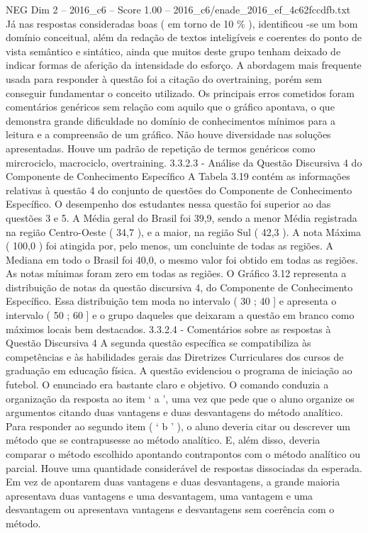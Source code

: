 \begin{textsample}{NEG Dim 2 – 2016\_c6 – Score 1.00 – 2016\_c6/enade\_2016\_ef\_4c62fccdfb.txt}
Já nas respostas consideradas boas ( em torno de 10 \% ), identificou -se um bom domínio conceitual, além da redação de textos inteligíveis e coerentes do ponto de vista semântico e sintático, ainda que muitos deste grupo tenham deixado de indicar formas de aferição da intensidade do esforço.
A abordagem mais frequente usada para responder à questão foi a citação do overtraining, porém sem conseguir fundamentar o conceito utilizado.
Os principais erros cometidos foram comentários genéricos sem relação com aquilo que o gráfico apontava, o que demonstra grande dificuldade no domínio de conhecimentos mínimos para a leitura e a compreensão de um gráfico.
Não houve diversidade nas soluções apresentadas.
Houve um padrão de repetição de termos genéricos como mircrociclo, macrociclo, overtraining. 3.3.2.3 - Análise da Questão Discursiva 4 do Componente de Conhecimento Específico A Tabela 3.19 contém as informações relativas à questão 4 do conjunto de questões do Componente de Conhecimento Específico.
O desempenho dos estudantes nessa questão foi superior ao das questões 3 e 5.
A Média geral do Brasil foi 39,9, sendo a menor Média registrada na região Centro-Oeste ( 34,7 ), e a maior, na região Sul ( 42,3 ).
A nota Máxima ( 100,0 ) foi atingida por, pelo menos, um concluinte de todas as regiões.
A Mediana em todo o Brasil foi 40,0, o mesmo valor foi obtido em todas as regiões.
As notas mínimas foram zero em todas as regiões.
O Gráfico 3.12 representa a distribuição de notas da questão discursiva 4, do Componente de Conhecimento Específico.
Essa distribuição tem moda no intervalo ( 30 ; 40 ] e apresenta o intervalo ( 50 ; 60 ] e o grupo daqueles que deixaram a questão em branco como máximos locais bem destacados. 3.3.2.4 - Comentários sobre as respostas à Questão Discursiva 4 A segunda questão específica se compatibiliza às competências e às habilidades gerais das Diretrizes Curriculares dos cursos de graduação em educação física.
A questão evidenciou o programa de iniciação ao futebol.
O enunciado era bastante claro e objetivo.
O comando conduzia a organização da resposta ao item ‘ a ’, uma vez que pede que o aluno organize os argumentos citando duas vantagens e duas desvantagens do método analítico.
Para responder ao segundo item ( ‘ b ’ ), o aluno deveria citar ou descrever um método que se contrapusesse ao método analítico.
E, além disso, deveria comparar o método escolhido apontando contrapontos com o método analítico ou parcial.
Houve uma quantidade considerável de respostas dissociadas da esperada.
Em vez de apontarem duas vantagens e duas desvantagens, a grande maioria apresentava duas vantagens e uma desvantagem, uma vantagem e uma desvantagem ou apresentava vantagens e desvantagens sem coerência com o método.

\end{textsample}
